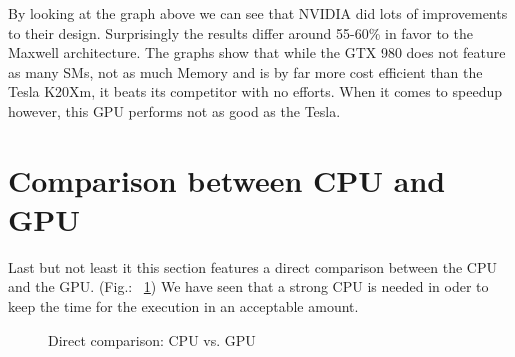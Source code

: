 \documentclass[draft, final]{vutinfth} %
\begin{document}
			By looking at the graph above we can see that NVIDIA did lots of improvements to their design. Surprisingly the results differ around 55-60\% in favor to the Maxwell architecture. The graphs show that while the GTX 980 does not feature as many SMs, not as much Memory and is by far more cost efficient than the Tesla K20Xm, it beats its competitor with no efforts. When it comes to speedup however, this GPU performs not as good as the Tesla.

		\section{Comparison between CPU and GPU}
			Last but not least it this section features a direct comparison between the CPU and the GPU. (Fig.: ~\ref{fig:cpu_vs_gpu_impl_1_inc_size}) We have seen that a strong CPU is needed in oder to keep the time for the execution in an acceptable amount. 

			\begin{figure}[!ht]
				\centering
				\begin{subfigure}[t]{2\textwidth}
				\end{subfigure}
				\caption{Direct comparison: CPU vs. GPU}
				\label{fig:cpu_vs_gpu_impl_1_inc_size}
			\end{figure}
			
\end{document}
